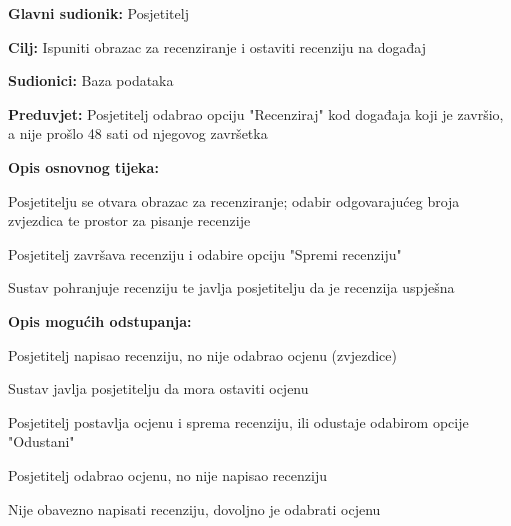 					\noindent {}
\begin{packed_item}
	\item \textbf{Glavni sudionik:} Posjetitelj
	\item  \textbf{Cilj:} Ispuniti obrazac za recenziranje i ostaviti recenziju na događaj
	\item  \textbf{Sudionici:} Baza podataka
	\item  \textbf{Preduvjet:} Posjetitelj odabrao opciju "Recenziraj" kod događaja koji je završio, a nije prošlo 48 sati od njegovog završetka
	\item  \textbf{Opis osnovnog tijeka:}
	
	\item[] \begin{packed_enum}
		
		\item Posjetitelju se otvara obrazac za recenziranje; odabir odgovarajućeg broja zvjezdica te prostor za pisanje recenzije
		\item Posjetitelj završava recenziju i odabire opciju "Spremi recenziju"
		\item Sustav pohranjuje recenziju te javlja posjetitelju da je recenzija uspješna
	\end{packed_enum}
	
	\item  \textbf{Opis mogućih odstupanja:}
	
	\item[] \begin{packed_item}
		
		\item[2.a] Posjetitelj napisao recenziju, no nije odabrao ocjenu (zvjezdice)
		\item[] \begin{packed_enum}
			
			\item Sustav javlja posjetitelju da mora ostaviti ocjenu
			\item Posjetitelj postavlja ocjenu i sprema recenziju, ili odustaje odabirom opcije "Odustani"
			
		\end{packed_enum}
		\item[2.b] Posjetitelj odabrao ocjenu, no nije napisao recenziju
			\item[] \begin{packed_enum}
			
			\item Nije obavezno napisati recenziju, dovoljno je odabrati ocjenu
			
		\end{packed_enum}
		
	\end{packed_item}
\end{packed_item}

